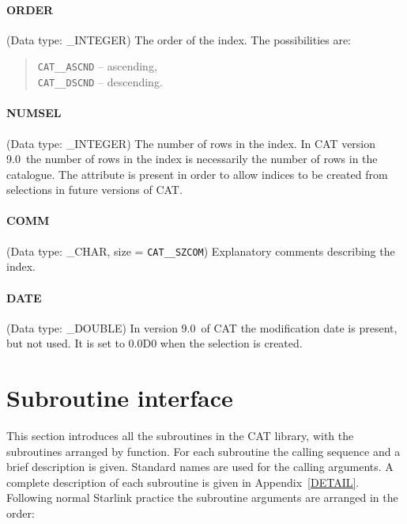 \documentclass[11pt,twoside]{starlink}
\providecommand{\CATversion}{9.0~}
\begin{document}
\paragraph{ORDER}
(Data type: \_INTEGER)
The order of the index. The possibilities are:

\begin{verse}
\texttt{CAT\_\_ASCND} -- ascending,  \\
\texttt{CAT\_\_DSCND} -- descending.
\end{verse}

\paragraph{NUMSEL}
(Data type: \_INTEGER)
The number of rows in the index. In CAT version \CATversion the number
of rows in the index is necessarily the number of rows in the catalogue.
The attribute is present in order to allow indices to be created from
selections in future versions of CAT.

\paragraph{COMM}
(Data type: \_CHAR, size = \texttt{CAT\_\_SZCOM})
Explanatory comments describing the index.

\paragraph{DATE}
(Data type: \_DOUBLE)
In version \CATversion of CAT the modification date is present, but
not used. It is set to 0.0D0 when the selection is created.


\section{\label{SUBINT}Subroutine interface}


% 



This section introduces all the subroutines in the CAT library, with the
subroutines arranged by function. For each subroutine the calling
sequence and a brief description is given. Standard names are used for
the calling arguments. A complete description of each subroutine is
given in Appendix~\ref{DETAIL}. Following normal Starlink practice the
subroutine arguments are arranged in the order:
\end{document}
